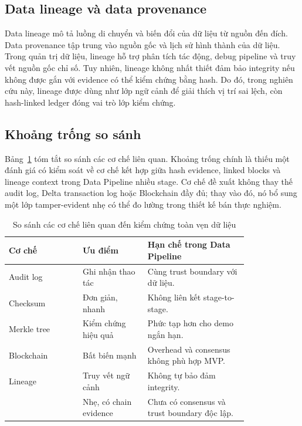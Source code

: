 \subsection{Data lineage và data provenance}

Data lineage mô tả luồng di chuyển và biến đổi của dữ liệu từ nguồn đến đích. Data provenance tập trung vào nguồn gốc và lịch sử hình thành của dữ liệu. Trong quản trị dữ liệu, lineage hỗ trợ phân tích tác động, debug pipeline và truy vết nguồn gốc chỉ số. Tuy nhiên, lineage không nhất thiết đảm bảo integrity nếu không được gắn với evidence có thể kiểm chứng bằng hash. Do đó, trong nghiên cứu này, lineage được dùng như lớp ngữ cảnh để giải thích vị trí sai lệch, còn hash-linked ledger đóng vai trò lớp kiểm chứng.

\subsection{Khoảng trống so sánh}

Bảng~\ref{tab:related_comparison} tóm tắt so sánh các cơ chế liên quan. Khoảng trống chính là thiếu một đánh giá có kiểm soát về cơ chế kết hợp giữa hash evidence, linked blocks và lineage context trong Data Pipeline nhiều stage. Cơ chế đề xuất không thay thế audit log, Delta transaction log hoặc Blockchain đầy đủ; thay vào đó, nó bổ sung một lớp tamper-evident nhẹ có thể đo lường trong thiết kế bán thực nghiệm.

\begin{table}[t]
\caption{So sánh các cơ chế liên quan đến kiểm chứng toàn vẹn dữ liệu}
\centering
\begin{tabular}{p{0.25\linewidth}p{0.22\linewidth}p{0.34\linewidth}}
\toprule
\textbf{Cơ chế} & \textbf{Ưu điểm} & \textbf{Hạn chế trong Data Pipeline} \\
\midrule
Audit log & Ghi nhận thao tác & Cùng trust boundary với dữ liệu. \\
Checksum & Đơn giản, nhanh & Không liên kết stage-to-stage. \\
Merkle tree & Kiểm chứng hiệu quả & Phức tạp hơn cho demo ngắn hạn. \\
Blockchain & Bất biến mạnh & Overhead và consensus không phù hợp MVP. \\
Lineage & Truy vết ngữ cảnh & Không tự bảo đảm integrity. \\
\hashledger{} & Nhẹ, có chain evidence & Chưa có consensus và trust boundary độc lập. \\
\bottomrule
\end{tabular}
\label{tab:related_comparison}
\end{table}
